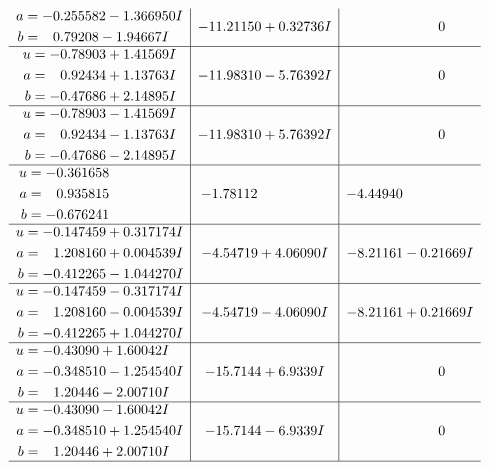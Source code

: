 \documentclass[1p]{elsarticle_modified}
\theoremstyle{definition}
\begin{document}
$$\begin{array}{c|c|c}
\begin{aligned}
a &= -0.255582 - 1.366950 I \\
b &= \phantom{-}0.79208 - 1.94667 I\end{aligned}
 & -11.21150 + 0.32736 I & \phantom{-0.000000 } 0 \\ \hline\begin{aligned}
u &= -0.78903 + 1.41569 I \\
a &= \phantom{-}0.92434 + 1.13763 I \\
b &= -0.47686 + 2.14895 I\end{aligned}
 & -11.98310 - 5.76392 I & \phantom{-0.000000 } 0 \\ \hline\begin{aligned}
u &= -0.78903 - 1.41569 I \\
a &= \phantom{-}0.92434 - 1.13763 I \\
b &= -0.47686 - 2.14895 I\end{aligned}
 & -11.98310 + 5.76392 I & \phantom{-0.000000 } 0 \\ \hline\begin{aligned}
u &= -0.361658\phantom{ +0.000000I} \\
a &= \phantom{-}0.935815\phantom{ +0.000000I} \\
b &= -0.676241\phantom{ +0.000000I}\end{aligned}
 & -1.78112\phantom{ +0.000000I} & -4.44940\phantom{ +0.000000I} \\ \hline\begin{aligned}
u &= -0.147459 + 0.317174 I \\
a &= \phantom{-}1.208160 + 0.004539 I \\
b &= -0.412265 - 1.044270 I\end{aligned}
 & -4.54719 + 4.06090 I & -8.21161 - 0.21669 I \\ \hline\begin{aligned}
u &= -0.147459 - 0.317174 I \\
a &= \phantom{-}1.208160 - 0.004539 I \\
b &= -0.412265 + 1.044270 I\end{aligned}
 & -4.54719 - 4.06090 I & -8.21161 + 0.21669 I \\ \hline\begin{aligned}
u &= -0.43090 + 1.60042 I \\
a &= -0.348510 - 1.254540 I \\
b &= \phantom{-}1.20446 - 2.00710 I\end{aligned}
 & -15.7144 + 6.9339 I & \phantom{-0.000000 } 0 \\ \hline\begin{aligned}
u &= -0.43090 - 1.60042 I \\
a &= -0.348510 + 1.254540 I \\
b &= \phantom{-}1.20446 + 2.00710 I\end{aligned}
 & -15.7144 - 6.9339 I & \phantom{-0.000000 } 0\\
 \hline 
 \end{array}$$\newpage\newpage\renewcommand{\arraystretch}{1}
\end{document}
